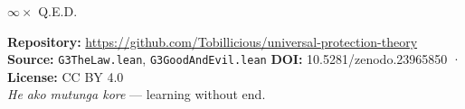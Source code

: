 \bigskip

\begin{center}
{\Large\color{korugreen} $\infty \times$ Q.E.D.}
\end{center}

\bigskip

\noindent\small\textbf{Repository:} \url{https://github.com/Tobillicious/universal-protection-theory}
\textbf{Source:} \texttt{G3TheLaw.lean}, \texttt{G3GoodAndEvil.lean}
\textbf{DOI:} 10.5281/zenodo.23965850 · \textbf{License:} CC BY 4.0\\[0.5em]
\textit{He ako mutunga kore} — learning without end. 🌿


